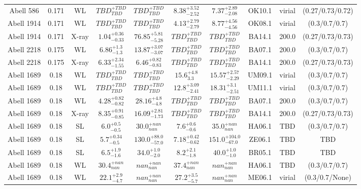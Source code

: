 \begin{table}
\begin{tabular}{cccccccccc}
Abell 586 & 0.171 & WL & ${TBD}^{+TBD}_{TBD}$ & ${TBD}^{+TBD}_{TBD}$ & ${8.38}^{+3.52}_{-2.52}$ & ${7.37}^{+2.89}_{-2.08}$ & OK10.1 & virial & (0.27/0.73/0.72) \\
Abell 1914 & 0.171 & WL & ${TBD}^{+TBD}_{TBD}$ & ${TBD}^{+TBD}_{TBD}$ & ${4.13}^{+2.79}_{-2.79}$ & ${8.77}^{+4.56}_{-4.56}$ & OK08.1 & virial & (0.3/0.7/0.7) \\
Abell 1914 & 0.171 & X-ray & ${1.04}^{+0.36}_{-0.33}$ & ${76.85}^{+5.81}_{-5.28}$ & ${TBD}^{+TBD}_{TBD}$ & ${TBD}^{+TBD}_{TBD}$ & BA14.1 & 200.0 & (0.27/0.73/0.73) \\
Abell 2218 & 0.175 & WL & ${6.86}^{+1.3}_{-1.3}$ & ${13.87}^{+3.07}_{-3.07}$ & ${TBD}^{+TBD}_{TBD}$ & ${TBD}^{+TBD}_{TBD}$ & BA07.1 & 200.0 & (0.3/0.7/0.7) \\
Abell 2218 & 0.175 & X-ray & ${6.33}^{+2.34}_{-1.55}$ & ${6.46}^{+0.82}_{-0.83}$ & ${TBD}^{+TBD}_{TBD}$ & ${TBD}^{+TBD}_{TBD}$ & BA14.1 & 200.0 & (0.27/0.73/0.73) \\
Abell 1689 & 0.18 & WL & ${TBD}^{+TBD}_{TBD}$ & ${TBD}^{+TBD}_{TBD}$ & ${15.6}^{+4.8}_{3.3}$ & ${15.57}^{+2.57}_{-2.29}$ & UM09.1 & virial & (0.3/0.7/0.7) \\
Abell 1689 & 0.18 & WL & ${TBD}^{+TBD}_{TBD}$ & ${TBD}^{+TBD}_{TBD}$ & ${12.8}^{+3.09}_{-2.41}$ & ${18.31}^{+3.1}_{-2.51}$ & UM11.1 & virial & (0.3/0.7/0.7) \\
Abell 1689 & 0.18 & WL & ${4.28}^{+0.82}_{-0.82}$ & ${28.16}^{+4.8}_{-4.8}$ & ${TBD}^{+TBD}_{TBD}$ & ${TBD}^{+TBD}_{TBD}$ & BA07.1 & 200.0 & (0.3/0.7/0.7) \\
Abell 1689 & 0.18 & X-ray & ${8.35}^{+0.91}_{-0.85}$ & ${16.09}^{+2.81}_{-1.73}$ & ${TBD}^{+TBD}_{TBD}$ & ${TBD}^{+TBD}_{TBD}$ & BA14.1 & 200.0 & (0.27/0.73/0.73) \\
Abell 1689 & 0.18 & SL & ${6.0}^{+0.5}_{-0.5}$ & ${30.0}^{+nan}_{nan}$ & ${7.6}^{+0.6}_{-0.6}$ & ${35.0}^{+nan}_{nan}$ & HA06.1 & TBD & (0.3/0.7/0.7) \\
Abell 1689 & 0.18 & SL & ${5.7}^{+0.34}_{-0.5}$ & ${130.0}^{+88.0}_{-57.0}$ & ${7.18}^{+0.42}_{-0.62}$ & ${151.0}^{+104.0}_{-67.0}$ & ZE06.1 & TBD & TBD \\
Abell 1689 & 0.18 & SL & ${6.5}^{+1.9}_{-1.6}$ & ${34.0}^{+1.0}_{-2.0}$ & ${8.2}^{+2.1}_{-1.8}$ & ${40.0}^{+1.0}_{-1.0}$ & BR05.1 & TBD & TBD \\
Abell 1689 & 0.18 & WL & ${30.4}^{+nan}_{nan}$ & ${nan}^{+nan}_{nan}$ & ${37.4}^{+nan}_{nan}$ & ${nan}^{+nan}_{nan}$ & HA06.1 & TBD & (0.3/0.7/0.7) \\
Abell 1689 & 0.18 & WL & ${22.1}^{+2.9}_{-4.7}$ & ${nan}^{+nan}_{nan}$ & ${27.2}^{+3.5}_{-5.7}$ & ${nan}^{+nan}_{nan}$ & ME06.1 & virial & (0.3/0.7/None) \\

\end{tabular}
\end{table}
